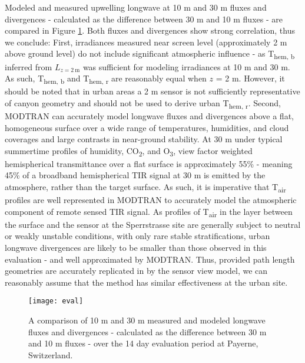 \begin{bibunit}
Modeled and measured upwelling longwave at 10 \si{m} and 30 \si{m} fluxes and divergences - calculated as the difference between 30 \si{\meter} and 10 \si{\meter} fluxes - are compared in Figure \ref{fluxes}. Both fluxes and divergences show strong correlation, thus we conclude: First, irradiances measured near screen level (approximately 2 \si{\meter} above ground level) do not include significant atmospheric influence - as T\textsubscript{hem, b} inferred from $L_{z=2~\si{\meter}}$ was sufficient for modeling irradiances at 10 \si{m} and 30 \si{m}. As such, T\textsubscript{hem, b} and T\textsubscript{hem, r} are reasonably equal when $z$ = 2 \si{m}. However, it should be noted that in urban areas a 2 \si{m} sensor is not sufficiently representative of canyon geometry and should not be used to derive urban T\textsubscript{hem, r}. Second, MODTRAN can accurately model longwave fluxes and divergences above a flat, homogeneous surface over a wide range of temperatures, humidities, and cloud coverages and large contrasts in near-ground stability. At 30 \si{\meter} under typical summertime profiles of humidity, CO\textsubscript{2}, and O\textsubscript{3}, view factor weighted hemispherical transmittance over a flat surface is approximately 55\% - meaning 45\% of a broadband hemispherical TIR signal at 30 \si{\meter} is emitted by the atmosphere, rather than the target surface. As such, it is imperative that T\textsubscript{air} profiles are well represented in MODTRAN to accurately model the atmospheric component of remote sensed TIR signal. As profiles of T\textsubscript{air} in the layer between the surface and the sensor at the Sperrstrasse site are generally subject to neutral or weakly unstable conditions, with only rare stable stratifications, urban longwave divergences are likely to be smaller than those observed in this evaluation - and well approximated by MODTRAN. Thus, provided path length geometries are accurately replicated in by the sensor view model, we can reasonably assume that the method has similar effectiveness at the urban site.

\begin{figure}[H]
	\centering
	\texttt{[image: eval]}
	\caption{A comparison of 10 \si{m} and 30 \si{m} measured and modeled longwave fluxes and divergences - calculated as the difference between 30 \si{\meter} and 10 \si{\meter} fluxes - over the 14 day evaluation period at Payerne, Switzerland.}
	\label{fluxes}
\end{figure}


\end{bibunit}
